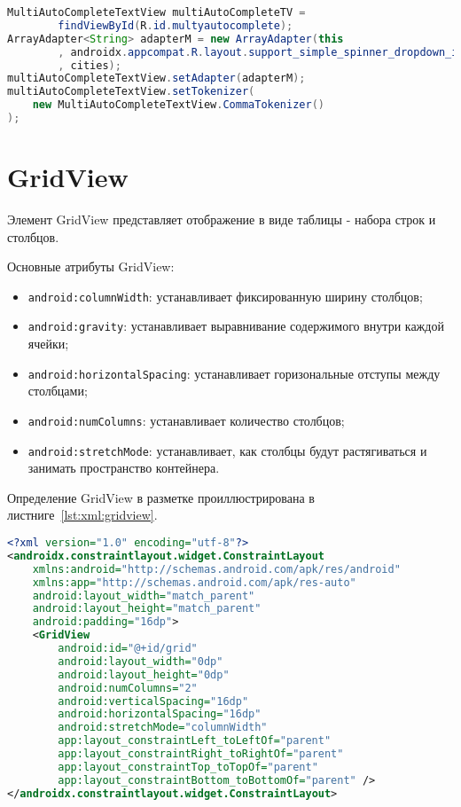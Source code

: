 \begin{lstlisting}[language=Java
	, label=lst:java:multyautocomplete
	]
MultiAutoCompleteTextView multiAutoCompleteTV = 
		findViewById(R.id.multyautocomplete);
ArrayAdapter<String> adapterM = new ArrayAdapter(this
		, androidx.appcompat.R.layout.support_simple_spinner_dropdown_item
		, cities);
multiAutoCompleteTextView.setAdapter(adapterM);
multiAutoCompleteTextView.setTokenizer(
	new MultiAutoCompleteTextView.CommaTokenizer()
);
\end{lstlisting}

\section{GridView}
Элемент GridView представляет отображение в виде таблицы - набора строк
и столбцов.\par
Основные атрибуты GridView:

\begin{itemize}
	\item \texttt{android:columnWidth}: устанавливает фиксированную ширину
		столбцов;
	\item \texttt{android:gravity}: устанавливает выравнивание содержимого
		внутри каждой ячейки;
	\item \texttt{android:horizontalSpacing}: устанавливает горизональные
		отступы между столбцами;
	\item \texttt{android:numColumns}: устанавливает количество столбцов;
	\item \texttt{android:stretchMode}: устанавливает, как столбцы будут
		растягиваться и занимать пространство контейнера.
\end{itemize}

Определение GridView в разметке проиллюстрирована
в листниге~\ref{lst:xml:gridview}.
\begin{lstlisting}[language=XML
	, label=lst:xml:gridview
	]
<?xml version="1.0" encoding="utf-8"?>
<androidx.constraintlayout.widget.ConstraintLayout
    xmlns:android="http://schemas.android.com/apk/res/android"
    xmlns:app="http://schemas.android.com/apk/res-auto"
    android:layout_width="match_parent"
    android:layout_height="match_parent"
    android:padding="16dp">
    <GridView
        android:id="@+id/grid"
        android:layout_width="0dp"
        android:layout_height="0dp"
        android:numColumns="2"
        android:verticalSpacing="16dp"
        android:horizontalSpacing="16dp"
        android:stretchMode="columnWidth"
        app:layout_constraintLeft_toLeftOf="parent"
        app:layout_constraintRight_toRightOf="parent"
        app:layout_constraintTop_toTopOf="parent"
        app:layout_constraintBottom_toBottomOf="parent" />
</androidx.constraintlayout.widget.ConstraintLayout>
\end{lstlisting}


